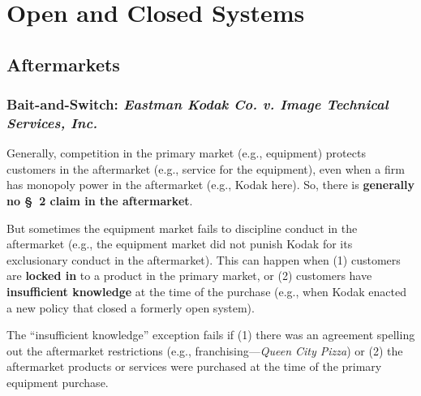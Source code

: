\section{Open and Closed Systems}

\subsection{Aftermarkets}

\subsubsection{Bait-and-Switch: \emph{Eastman Kodak Co. v. Image Technical 
Services, Inc.}}

Generally, competition in the primary market (e.g., equipment) protects 
customers in the aftermarket (e.g., service for the equipment), even when a 
firm has monopoly power in the aftermarket (e.g., Kodak here). So, there is 
\textbf{generally no \S\ 2 claim in the aftermarket}.

But sometimes the equipment market fails to discipline conduct in the 
aftermarket (e.g., the equipment market did not punish Kodak for its 
exclusionary conduct in the aftermarket). This can happen when (1) customers 
are \textbf{locked in} to a product in the primary market, or (2) customers 
have \textbf{insufficient knowledge} at the time of the purchase (e.g., when 
Kodak enacted a new policy that closed a formerly open system).

The ``insufficient knowledge'' exception fails if (1) there was an agreement 
spelling out the aftermarket restrictions (e.g., franchising---\emph{Queen 
City Pizza}) or (2) the aftermarket products or services were purchased at the 
time of the primary equipment purchase.

